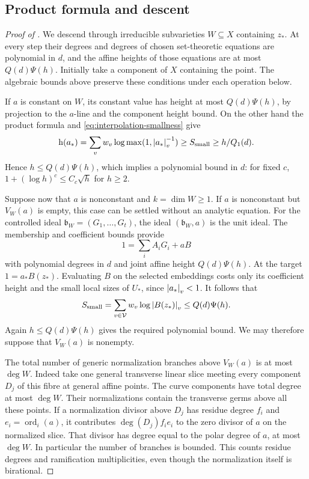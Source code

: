 \subsection{Product formula and descent}

\begin{proof}[Proof of ]
We descend through irreducible subvarieties $W\subseteq X$ containing
$z_*$.  At every step their degrees and degrees of chosen
set-theoretic equations are polynomial in $d$, and the affine heights
of those equations are at most $Q(d)\Psi(h)$.  Initially take a
component of $X$ containing the point.  The algebraic bounds above
preserve these conditions under each operation below.

If $a$ is constant on $W$, its constant value has height at most
$Q(d)\Psi(h)$, by projection to the $a$-line and the component height
bound.  On the other hand the product formula and
\eqref{eq:interpolation-smallness} give
\begin{equation}\label{eq:constant-parameter-height}
 \mathrm h\!\left(a_*\right)=\sum_vw_v\log\max(1,\left\lvert a_*\right\rvert_v^{-1})
 \geq S_{\rm small}\geq h/Q_1(d).
\end{equation}
Hence $h\leq Q(d)\Psi(h)$, which implies a polynomial bound in $d$:
for fixed $c$, $1+(\log h)^c\leq C_c\sqrt h$ for $h\geq2$.

Suppose now that $a$ is nonconstant and $k=\dim W\geq1$.
If $a$ is nonconstant but $V_W(a)$ is empty, this case can be settled
without an analytic equation.  For the controlled ideal
$\mathfrak b_W=(G_1,\ldots,G_t)$, the ideal $(\mathfrak b_W,a)$ is the
unit ideal.  The membership and coefficient bounds provide
\[
 1=\sum_i A_iG_i+aB
\]
with polynomial degrees in $d$ and joint affine height
$Q(d)\Psi(h)$.  At the target $1=a_*B(z_*)$.  Evaluating $B$ on the
selected embeddings costs only its coefficient height and the small
local sizes of $U_*$, since $\left\lvert a_*\right\rvert_v<1$.  It follows that
\[
 S_{\rm small}=\sum_{v\in\mathcal V}w_v\log\left\lvert B(z_*)\right\rvert_v
 \leq Q(d)\Psi(h).
\]
Again $h\leq Q(d)\Psi(h)$ gives the required polynomial bound.
We may therefore suppose that $V_W(a)$ is nonempty.

The total number of generic normalization branches above $V_W(a)$ is
at most $\deg W$.  Indeed take one general transverse linear slice
meeting every component $D_j$ of this fibre at general affine points.
The curve components have total degree at most $\deg W$.  Their
normalizations contain the transverse germs above all these points.
If a normalization divisor above $D_j$ has residue degree $f_i$ and
$e_i=\operatorname{ord}_i(a)$, it contributes
$\deg(D_j)f_ie_i$ to the zero divisor of $a$ on the normalized slice.
That divisor has degree equal to the polar degree of $a$, at most
$\deg W$.  In particular the number of branches is bounded.  This
counts residue degrees and ramification multiplicities, even though
the normalization itself is birational.


\end{proof}
